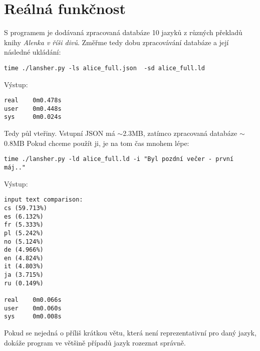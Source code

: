 \documentclass[11pt]{article}
\begin{document}
\section{Reálná funkčnost}
S programem je dodávaná zpracovaná databáze 10 jazyků z různých překladů knihy \textit{Alenka v říši divů}. Změřme tedy dobu zpracovávání databáze a její následné ukládání:
\begin{lstlisting}
time ./lansher.py -ls alice_full.json  -sd alice_full.ld
\end{lstlisting}

Výstup:
\begin{lstlisting}
real	0m0.478s
user	0m0.448s
sys 	0m0.024s
\end{lstlisting}

Tedy půl vteřiny. Vstupní JSON má $\sim$2.3MB, zatímco zpracovaná databáze $\sim$0.8MB Pokud chceme použít ji, je na tom čas mnohem lépe:
\begin{lstlisting}
time ./lansher.py -ld alice_full.ld -i "Byl pozdní večer - první máj.."
\end{lstlisting}

Výstup:
\begin{lstlisting}input text comparison:
cs (59.713%)
es (6.132%)
fr (5.333%)
pl (5.242%)
no (5.124%)
de (4.966%)
en (4.824%)
it (4.803%)
ja (3.715%)
ru (0.149%)

real	0m0.066s
user	0m0.060s
sys 	0m0.008s
\end{lstlisting}

Pokud se nejedná o příliš krátkou větu, která není reprezentativní pro daný jazyk, dokáže program ve většině případů jazyk rozeznat správně.
\end{document}
